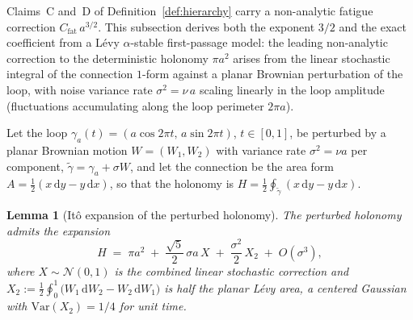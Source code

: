\documentclass[11pt,a4paper]{article}
\theoremstyle{plain}
\newtheorem{lemma}[theorem]{Lemma}
\theoremstyle{definition}
\theoremstyle{remark}
\begin{document}
Claims~C and~D of Definition~\ref{def:hierarchy} carry a
non-analytic fatigue correction $C_{\mathrm{fat}}\,a^{3/2}$. This
subsection derives both the exponent $3/2$ and the exact
coefficient from a L\'evy $\alpha$-stable first-passage model: the
leading non-analytic correction to the deterministic holonomy
$\pi a^{2}$ arises from the linear stochastic integral of the
connection $1$-form against a planar Brownian perturbation of the
loop, with noise variance rate $\sigma^{2}=\nu\,a$ scaling
linearly in the loop amplitude (fluctuations accumulating along
the loop perimeter $2\pi a$).

Let the loop $\gamma_a(t)=(a\cos 2\pi t,\,a\sin 2\pi t)$,
$t\in[0,1]$, be perturbed by a planar Brownian motion
$W=(W_1,W_2)$ with variance rate $\sigma^{2}=\nu a$ per component,
$\tilde\gamma=\gamma_a+\sigma W$, and let the connection be the
area form $A=\tfrac12(x\,\mathrm{d}y-y\,\mathrm{d}x)$, so that
the holonomy is $H=\tfrac12\oint_{\tilde\gamma}(x\,\mathrm{d}y-
y\,\mathrm{d}x)$.

\begin{lemma}[It\^o expansion of the perturbed holonomy]
\label{lem:ito-expand}
The perturbed holonomy admits the expansion
\begin{equation}\label{eq:H-expand}
  H \;=\; \pi a^{2} \;+\; \frac{\sqrt{5}}{2}\,\sigma a\,X
  \;+\; \frac{\sigma^{2}}{2}\,X_2 \;+\; O(\sigma^{3}),
\end{equation}
where $X\sim\mathcal N(0,1)$ is the combined linear stochastic
correction and
$X_2 := \tfrac12\oint_0^1\bigl(W_1\,\mathrm{d}W_2 -
W_2\,\mathrm{d}W_1\bigr)$ is half the planar L\'evy area, a centered
Gaussian with $\mathrm{Var}(X_2)=1/4$ for unit time.
\end{lemma}
\end{document}
